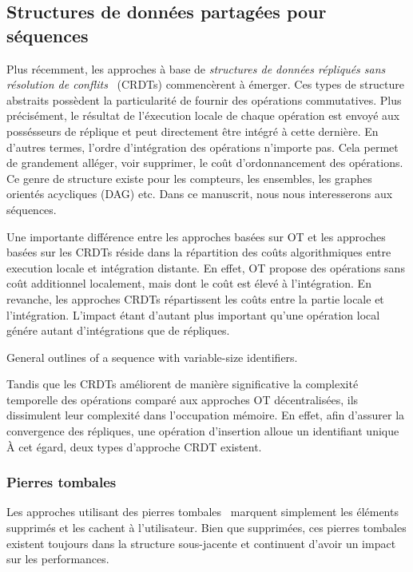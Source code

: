 \subsection{Structures de données partagées pour séquences}

Plus récemment, les approches à base de \emph{structures de données répliqués
  sans résolution de conflits}~\cite{shapiro2011comprehensive,
  shapiro2011conflict} (CRDTs) commencèrent à émerger. Ces types de structure
abstraits possèdent la particularité de fournir des opérations commutatives.
Plus précisément, le résultat de l'éxecution locale de chaque opération est
envoyé aux possésseurs de réplique et peut directement être intégré à cette
dernière.  En d'autres termes, l'ordre d'intégration des opérations n'importe
pas. Cela permet de grandement alléger, voir supprimer, le coût d'ordonnancement
des opérations. Ce genre de structure existe pour les compteurs, les ensembles,
les graphes orientés acycliques (DAG) etc. Dans ce manuscrit, nous nous
interesserons aux séquences.

Une importante différence entre les approches basées sur OT et les approches
basées sur les CRDTs réside dans la répartition des coûts algorithmiques entre
execution locale et intégration distante. En effet, OT propose des opérations
sans coût additionnel localement, mais dont le coût est élevé à l'intégration.
En revanche, les approches CRDTs répartissent les coûts entre la partie locale
et l'intégration.  L'impact étant d'autant plus important qu'une opération local
génére autant d'intégrations que de répliques.

\begin{algorithm}
  
  \caption{\label{algo:crdtabstract}General outlines of a sequence with
    variable-size identifiers.}
\end{algorithm}

Tandis que les CRDTs améliorent de manière significative la complexité
temporelle des opérations comparé aux approches OT décentralisées, ils
dissimulent leur complexité dans l'occupation mémoire. En effet, afin d'assurer
la convergence des répliques, une opération d'insertion alloue un identifiant
unique  À cet égard, deux types d'approche CRDT existent.

\subsubsection{Pierres tombales}

Les approches utilisant des pierres tombales~\cite{ahmed2011evaluating,
  conway2014language, grishchenko2010deep, oster2006data,
  preguica2009commutative, roh2011replicated, weiss2007wooki, wu2010partial,
  Yu2012stringwise} marquent simplement les éléments supprimés et les cachent à
l'utilisateur. Bien que supprimées, ces pierres tombales existent toujours dans
la structure sous-jacente et continuent d'avoir un impact sur les performances.

